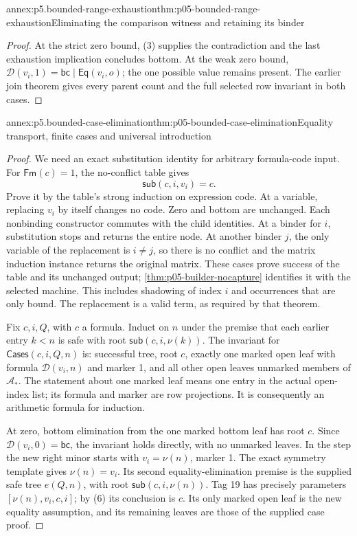 \begin{annexitem}{annex:p5.bounded-range-exhaustion}{thm:p05-bounded-range-exhaustion}{Eliminating the comparison witness and retaining its binder}
\begin{proof}
At the strict zero bound, (3) supplies the contradiction and the last
exhaustion implication concludes bottom. At the weak zero bound,
\(\mathcal D(v_i,1)=\mathsf{bc}\mathbin{|}\mathsf{Eq}(v_i,o)\);
the one possible value remains present. The earlier join theorem gives
every parent count and the full selected row invariant in both cases.
\end{proof}
\end{annexitem}

\begin{annexitem}{annex:p5.bounded-case-elimination}{thm:p05-bounded-case-elimination}{Equality transport, finite cases and universal introduction}
\begin{proof}
We need an exact substitution identity for arbitrary formula-code input.
For \(\mathsf{Fm}(c)=1\), the no-conflict table gives
\[
                    \mathsf{sub}(c,i,v_i)=c.
\tag{6}
\]
Prove it by the table's strong induction on expression code. At a variable,
replacing \(v_i\) by itself changes no code. Zero and bottom are
unchanged. Each nonbinding constructor commutes with the child identities.
At a binder for \(i\), substitution stops and returns the entire node.
At another binder \(j\), the only variable of the replacement is
\(i\ne j\), so there is no conflict and the matrix induction instance
returns the original matrix. These cases prove success of the table and
its unchanged output; \cref{thm:p05-builder-nocapture} identifies it
with the selected machine. This includes shadowing of index \(i\)
and occurrences that are only bound. The replacement is a valid term,
as required by that theorem.

Fix \(c,i,Q\), with \(c\) a formula. Induct on \(n\) under
the premise that each earlier entry \(k<n\) is safe with root
\(\mathsf{sub}(c,i,\nu(k))\). The invariant for
\(\mathsf{Cases}(c,i,Q,n)\) is: successful tree, root \(c\),
exactly one marked open leaf with formula \(\mathcal D(v_i,n)\)
and marker 1, and all other open leaves unmarked members of
\(\mathcal A_*\). The statement about one marked leaf means one
entry in the actual open-index list; its formula and marker are row
projections. It is consequently an arithmetic formula for induction.

At zero, bottom elimination from the one marked bottom leaf has root
\(c\). Since \(\mathcal D(v_i,0)=\mathsf{bc}\), the invariant
holds directly, with no unmarked leaves. In the step the new right minor
starts with \(v_i=\nu(n)\), marker 1. The exact symmetry template
gives \(\nu(n)=v_i\). Its second equality-elimination premise is
the supplied safe tree \(e(Q,n)\), with root
\(\mathsf{sub}(c,i,\nu(n))\). Tag 19 has precisely parameters
\([\nu(n),v_i,c,i]\); by (6) its conclusion is \(c\). Its only
marked open leaf is the new equality assumption, and its remaining leaves
are those of the supplied case proof.


\end{proof}
\end{annexitem}
